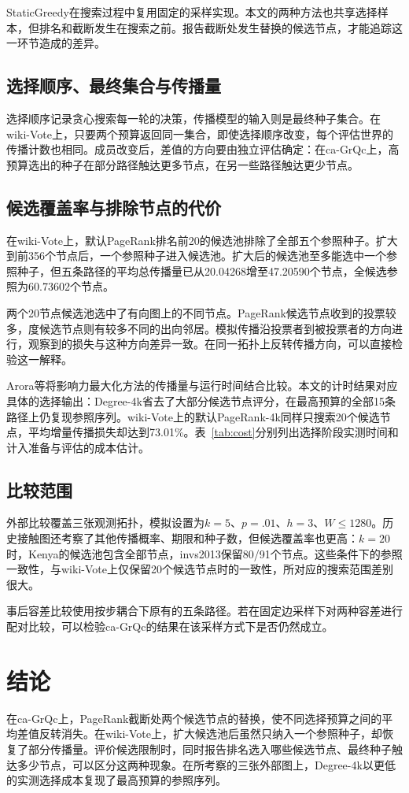 \documentclass[smallextended]{svjour3}
\begin{document}
StaticGreedy在搜索过程中复用固定的采样实现\cite{ref8}。本文的两种方法也共享选择样本，但排名和截断发生在搜索之前。报告截断处发生替换的候选节点，才能追踪这一环节造成的差异。

\subsection{选择顺序、最终集合与传播量}
选择顺序记录贪心搜索每一轮的决策，传播模型的输入则是最终种子集合。在wiki-Vote上，只要两个预算返回同一集合，即使选择顺序改变，每个评估世界的传播计数也相同。成员改变后，差值的方向要由独立评估确定：在ca-GrQc上，高预算选出的种子在部分路径触达更多节点，在另一些路径触达更少节点。

\subsection{候选覆盖率与排除节点的代价}
在wiki-Vote上，默认PageRank排名前20的候选池排除了全部五个参照种子。扩大到前356个节点后，一个参照种子进入候选池。扩大后的候选池至多能选中一个参照种子，但五条路径的平均总传播量已从20.04268增至47.20590个节点，全候选参照为60.73602个节点。

两个20节点候选池选中了有向图上的不同节点。PageRank候选节点收到的投票较多，度候选节点则有较多不同的出向邻居。模拟传播沿投票者到被投票者的方向进行，观察到的损失与这种方向差异一致。在同一拓扑上反转传播方向，可以直接检验这一解释。

Arora等将影响力最大化方法的传播量与运行时间结合比较\cite{ref16}。本文的计时结果对应具体的选择输出：Degree-4k省去了大部分候选节点评分，在最高预算的全部15条路径上仍复现参照序列。wiki-Vote上的默认PageRank-4k同样只搜索20个候选节点，平均增量传播损失却达到73.01\%。表~\ref{tab:cost}分别列出选择阶段实测时间和计入准备与评估的成本估计。

\subsection{比较范围}
外部比较覆盖三张观测拓扑，模拟设置为$k=5$、$p=.01$、$h=3$、$W\le1280$。历史接触图还考察了其他传播概率、期限和种子数，但候选覆盖率也更高：$k=20$时，Kenya的候选池包含全部节点，invs2013保留80/91个节点。这些条件下的参照一致性，与wiki-Vote上仅保留20个候选节点时的一致性，所对应的搜索范围差别很大。

事后容差比较使用按步耦合下原有的五条路径。若在固定边采样下对两种容差进行配对比较，可以检验ca-GrQc的结果在该采样方式下是否仍然成立。

\section{结论}
在ca-GrQc上，PageRank截断处两个候选节点的替换，使不同选择预算之间的平均差值反转消失。在wiki-Vote上，扩大候选池后虽然只纳入一个参照种子，却恢复了部分传播量。评价候选限制时，同时报告排名选入哪些候选节点、最终种子触达多少节点，可以区分这两种现象。在所考察的三张外部图上，Degree-4k以更低的实测选择成本复现了最高预算的参照序列。
\end{document}
